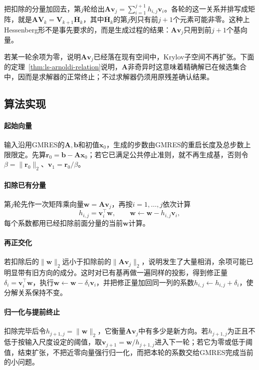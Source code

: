 把扣除的分量加回去，第$j$轮给出$\bm A\bm v_j=\sum_{i=1}^{j+1}h_{i,j}\bm v_i$。各轮的这一关系并排写成矩阵，就是$\bm A\bm V_k=\bm V_{k+1}\overline{\bm H}_k$，其中$\overline{\bm H}_k$的第$j$列只有前$j+1$个元素可能非零。这种上Hessenberg形不是事先要求的，而是生成过程的结果：$\bm A\bm v_j$只用到前$j+1$个基向量。

若某一轮余项为零，说明$\bm A\bm v_j$已经落在现有空间中，Krylov子空间不再扩张。下面的定理~\ref{thm:ls-arnoldi-relation}说明，$\bm A$非奇异时这意味着精确解已在候选集合中，因而是求解器的正常终止；不过求解器仍须用原残差确认结果。

\subsection{算法实现}

\paragraph{起始向量}
输入沿用GMRES的$\bm A,\bm b$和初值$\bm x_0$，生成的步数由GMRES的重启长度及总步数上限限定。先算$\bm r_0=\bm b-\bm A\bm x_0$；若它已满足公共停止准则，就不再生成基，否则令$\beta=\lVert\bm r_0\rVert_2$、$\bm v_1=\bm r_0/\beta$。

\paragraph{扣除已有分量}
第$j$轮先作一次矩阵乘向量$\bm w=\bm A\bm v_j$，再按$i=1,\ldots,j$依次计算
\[
 h_{i,j}=\bm v_i^\top\bm w,\qquad \bm w\leftarrow\bm w-h_{i,j}\bm v_i,
\]
每个系数都用已经扣除前面分量的当前$\bm w$计算。

\paragraph{再正交化}
若扣除后的$\lVert\bm w\rVert_2$远小于扣除前的$\lVert\bm A\bm v_j\rVert_2$，说明发生了大量相消，余项可能已明显带有旧方向的成分。这时对已有基再做一遍同样的投影，得到修正量$\delta_i=\bm v_i^\top\bm w$，执行$\bm w\leftarrow\bm w-\delta_i\bm v_i$，并把修正量加回同一列的系数$h_{i,j}\leftarrow h_{i,j}+\delta_i$，使分解关系保持不变。

\paragraph{归一化与提前终止}
扣除完毕后令$h_{j+1,j}=\lVert\bm w\rVert_2$，它衡量$\bm A\bm v_j$中有多少是新方向。若$h_{j+1,j}$为正且不低于按输入尺度设定的阈值，取$\bm v_{j+1}=\bm w/h_{j+1,j}$进入下一轮；若它为零或低于阈值，结束扩张，不把近零向量强行归一化，而把本轮的系数交给GMRES完成当前的小问题。

